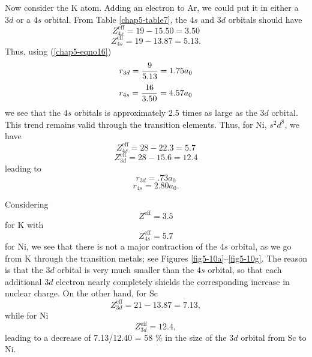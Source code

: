 Now consider the K atom.  Adding an electron to Ar, we could put it in
either a $3d$ or a $4s$ orbital.  From Table \ref{chap5-table7}, the $4s$
and $3d$ orbitals should have
\begin{equation}
Z^\mathrm{eff}_{4s} = 19 - 15.50 = 3.50
\end{equation}
\begin{equation}
Z^\mathrm{eff}_{4s} = 19 - 13.87 = 5.13 .
\end{equation}
Thus, using (\ref{chap5-eqno16})
\begin{equation}
r_{3d} = {9 \over 5.13} = 1.75 a_0
\end{equation}
\begin{equation}
r_{4s} = {16 \over 3.50} = 4.57 a_0
\end{equation}
we see that the $4s$ orbitals is approximately 2.5 times as large as 
the $3d$ orbital. This trend remains valid through the transition elements. 
Thus, for Ni, $s^2d^8$, we have
\begin{equation}
Z^\mathrm{eff}_{4s} = 28 - 22.3 = 5.7
\end{equation}
\begin{equation}
Z^\mathrm{eff}_{3d} = 28 - 15.6 = 12.4
\end{equation}
leading to
\begin{equation}
r_{3d} = .73 a_0
\end{equation}
\begin{equation}
r_{4s} = 2.80 a_0 .
\end{equation}
    
Considering
\begin{equation}
Z^\mathrm{eff} = 3.5
\end{equation}
for K with
\begin{equation}
Z^\mathrm{eff}_{4s} = 5.7
\end{equation}
for Ni, we see that there is not a major contraction of the $4s$ 
orbital, as we go from K through the transition metals; see Figures 
\ref{fig5-10a}--\ref{fig5-10g}.  The reason is that the $3d$ orbital is very much smaller than 
the $4s$ orbital, so that each additional $3d$ electron nearly
completely shields the corresponding increase in nuclear charge.  On
the other hand, for Sc
\begin{equation}
Z^\mathrm{eff}_{3d} = 21 - 13.87 = 7.13 ,
\end{equation}
while for Ni
\begin{equation}
Z^\mathrm{eff}_{3d} = 12.4 ,
\end{equation}
leading to a decrease of 7.13/12.40 = 58 \% in the size of the 
$3d$ orbital from Sc to Ni.

